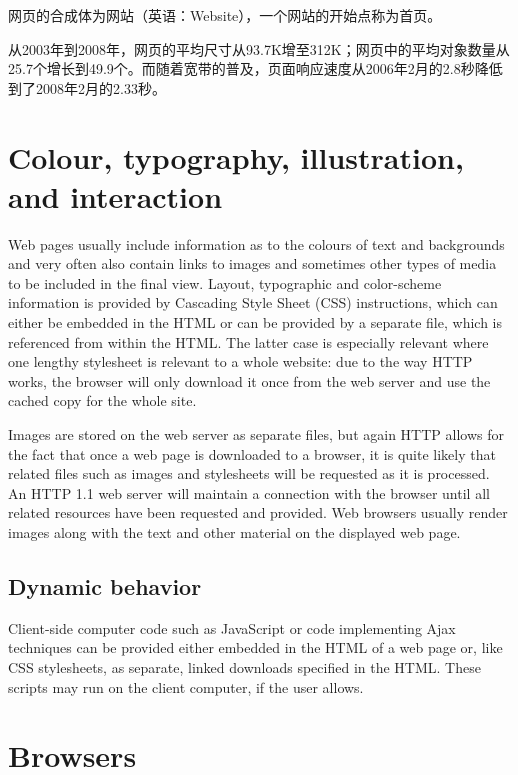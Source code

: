 网页的合成体为网站（英语：Website），一个网站的开始点称为首页。

从2003年到2008年，网页的平均尺寸从93.7K增至312K；网页中的平均对象数量从25.7个增长到49.9个。而随着宽带的普及，页面响应速度从2006年2月的2.8秒降低到了2008年2月的2.33秒。





\section{Colour, typography, illustration, and interaction}


Web pages usually include information as to the colours of text and backgrounds and very often also contain links to images and sometimes other types of media to be included in the final view. Layout, typographic and color-scheme information is provided by Cascading Style Sheet (CSS) instructions, which can either be embedded in the HTML or can be provided by a separate file, which is referenced from within the HTML. The latter case is especially relevant where one lengthy stylesheet is relevant to a whole website: due to the way HTTP works, the browser will only download it once from the web server and use the cached copy for the whole site.

Images are stored on the web server as separate files, but again HTTP allows for the fact that once a web page is downloaded to a browser, it is quite likely that related files such as images and stylesheets will be requested as it is processed. An HTTP 1.1 web server will maintain a connection with the browser until all related resources have been requested and provided. Web browsers usually render images along with the text and other material on the displayed web page.






\subsection{Dynamic behavior}

Client-side computer code such as JavaScript or code implementing Ajax techniques can be provided either embedded in the HTML of a web page or, like CSS stylesheets, as separate, linked downloads specified in the HTML. These scripts may run on the client computer, if the user allows.





\section{Browsers}

